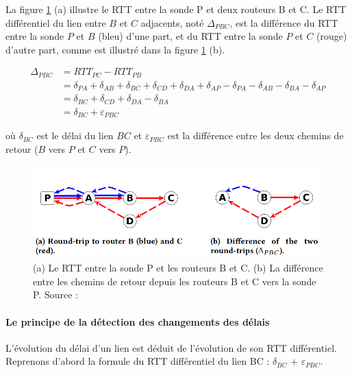 La figure 	\ref{fig:rtt-differ} (a)  illustre le RTT entre la sonde P et deux routeurs B et C. Le RTT différentiel  du lien entre  $B$ et $C$ adjacents, noté $\Delta_{PBC}$, est la différence du RTT entre la sonde $P$ et $B$ (bleu) d'une part, et du RTT entre la sonde $P$ et $C$  (rouge) d'autre part, comme est  illustré dans la figure	\ref{fig:rtt-differ} (b). 

\begin{align*}
\Delta_{PBC} &= RTT_{PC} - RTT_{PB} \\
&= \delta_{PA} + \delta_{AB} + \delta_{BC} + \delta_{CD} + \delta_{DA}+ \delta_{AP} - \delta_{PA} - \delta_{AB}- \delta_{BA} - \delta_{AP} \\
&=  \delta_{BC} + \delta_{CD} + \delta_{DA}- \delta_{BA} \\
&= \delta_{BC} + \varepsilon_{PBC}
\end{align*}

où $\delta_{BC}$ est le délai du lien $BC$ et $\varepsilon_{PBC}$ est la différence entre les deux chemins de retour ($B$ vers $P$ et $C$ vers $P$). 
\begin{figure}[H]
	\centering
		\captionsetup{justification= centering}
	\includegraphics[width=0.7\linewidth]{illustrations/rtt-differ}
	\caption{(a) Le RTT entre la sonde P et les routeurs B et C. (b) La différence entre les  chemins de retour depuis les routeurs B et C vers la sonde P. Source : \cite{DBLP:journals/corr/FontugneAPB16}}
	\label{fig:rtt-differ}
\end{figure}

\paragraph{Le principe de la détection des changements des délais}

L'évolution du délai d'un lien est déduit de l'évolution de son RTT différentiel. Reprenons d'abord la formule du RTT différentiel du lien BC :   $\delta_{BC}$ + $\varepsilon_{PBC}$. 
 
